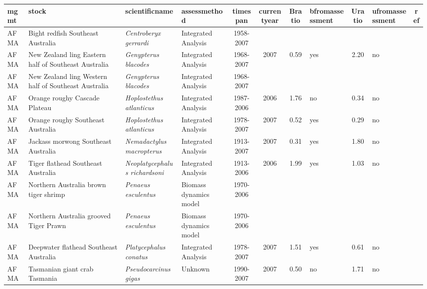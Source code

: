 \begin{longtable}{p{1.8cm}p{3.5cm}p{3.5cm}p{3cm}cccp{0.9cm}cp{0.9cm}c}
  \hline
mgmt & stock & scientificname & assessmethod & timespan & currentyear & Bratio & bfromassessment & Uratio & ufromassessment & ref \\ 
  \hline
AFMA & Bight redfish Southeast Australia & \textit{Centroberyx gerrardi} & Integrated Analysis & 1958-2007 &  &  &  &  &  & \cite{BIGHTREDDEEPFLATSE.pdf} \\ 
  AFMA & New Zealand ling Eastern half of Southeast Australia & \textit{Genypterus blacodes} & Integrated Analysis & 1968-2007 & 2007 & 0.59 & yes & 2.20 & no & \cite{NZLINGSE.pdf} \\ 
  AFMA & New Zealand ling Western half of Southeast Australia & \textit{Genypterus blacodes} & Integrated Analysis & 1968-2007 &  &  &  &  &  & \cite{NZLINGSE.pdf} \\ 
  AFMA & Orange roughy Cascade Plateau & \textit{Hoplostethus atlanticus} & Integrated Analysis & 1987-2006 & 2006 & 1.76 & no & 0.34 & no & \cite{CSIRO-Cascade-Plateau-Stock-Assessment-2006.pdf} \\ 
  AFMA & Orange roughy Southeast Australia & \textit{Hoplostethus atlanticus} & Integrated Analysis & 1978-2007 & 2007 & 0.52 & yes & 0.29 & no & \cite{OROUGHYSE.pdf} \\ 
  AFMA & Jackass morwong Southeast Australia & \textit{Nemadactylus macropterus} & Integrated Analysis & 1913-2007 & 2007 & 0.31 & yes & 1.80 & no & \cite{MORWONGSE.pdf} \\ 
  AFMA & Tiger flathead Southeast Australia & \textit{Neoplatycephalus richardsoni} & Integrated Analysis & 1913-2006 & 2006 & 1.99 & yes & 1.03 & no & \cite{TIGERFLATSE.pdf} \\ 
  AFMA & Northern Australia brown tiger shrimp & \textit{Penaeus esculentus} & Biomass dynamics model & 1970-2006 &  &  &  &  &  & \cite{NORTHPRAWNS.pdf} \\ 
  AFMA & Northern Australia grooved Tiger Prawn & \textit{Penaeus esculentus} & Biomass dynamics model & 1970-2006 &  &  &  &  &  & \cite{NORTHPRAWNS.pdf} \\ 
  AFMA & Deepwater flathead Southeast Australia & \textit{Platycephalus conatus} & Integrated Analysis & 1978-2007 & 2007 & 1.51 & yes & 0.61 & no & \cite{BIGHTREDDEEPFLATSE.pdf} \\ 
  AFMA & Tasmanian giant crab Tasmania & \textit{Pseudocarcinus gigas} & Unknown & 1990-2007 & 2007 & 0.50 & no & 1.71 & no & \cite{JENSEN_TASGIANTCRAB_2008.pdf} \\ 

\end{longtable}
